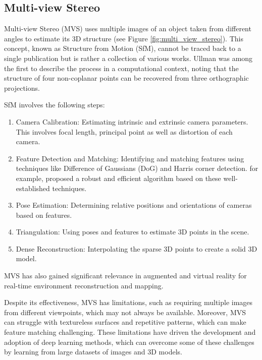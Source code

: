 \subsection{Multi-view Stereo}
Multi-view Stereo (MVS) uses multiple images of an object taken from different angles to estimate its 3D structure (see Figure \ref{fig:multi_view_stereo}). This concept, known as Structure from Motion (SfM), cannot be traced back to a single publication but is rather a collection of various works.
Ullman \autocite{ullman_interpretation_1997} was among the first to describe the process in a computational context, noting that the structure of four non-coplanar points can be recovered from three orthographic projections.

SfM involves the following steps:

\begin{enumerate}
    \item Camera Calibration: Estimating intrinsic and extrinsic camera parameters. This involves focal length, principal point as well as distortion of each camera.
    \item Feature Detection and Matching: Identifying and matching features using techniques like Difference of Gaussians (DoG) and Harris corner detection. \textcite{furukawa_accurate_2010} for example, proposed a robust and efficient algorithm based on these well-established techniques.
    \item Pose Estimation: Determining relative positions and orientations of cameras based on features.
    \item Triangulation: Using poses and features to estimate 3D points in the scene.
    \item Dense Reconstruction: Interpolating the sparse 3D points to create a solid 3D model.
\end{enumerate}

MVS has also gained significant relevance in augmented and virtual reality for real-time environment reconstruction and mapping.

Despite its effectiveness, MVS has limitations, such as requiring multiple images from different viewpoints, which may not always be available.
Moreover, MVS can struggle with textureless surfaces and repetitive patterns, which can make feature matching challenging.
These limitations have driven the development and adoption of deep learning methods, which can overcome some of these challenges by learning from large datasets of images and 3D models.

